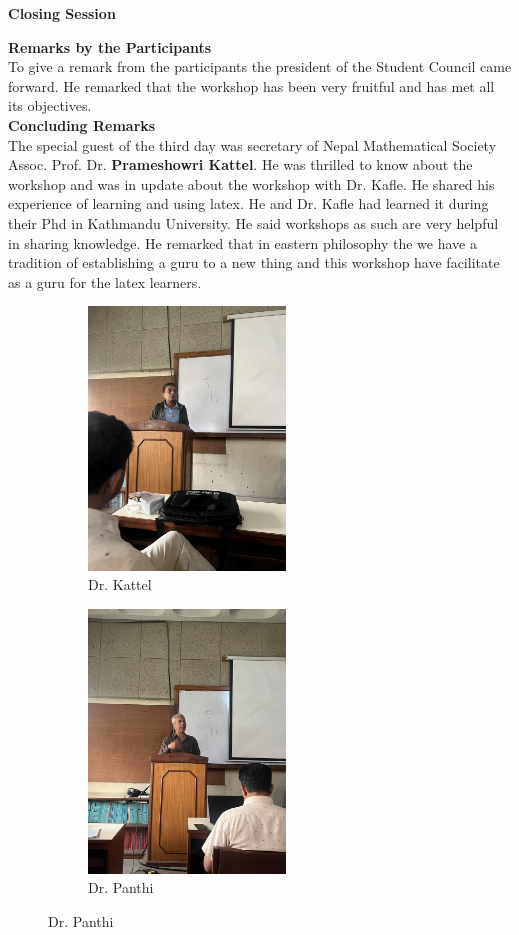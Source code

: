 \message{ !name(latexworkhop_report.tex)}\documentclass[a4paper,12pt]{report}
\begin{document}
\vspace*{3mm}
\begin{center}
  {\bfseries \Large Closing Session}
\end{center}
\vspace{5mm}

{\bfseries \large Remarks by the Participants}\\[3mm]
To give a remark from the participants the president of the Student Council came forward. He remarked that the workshop has been very fruitful and has met all its objectives.\\[7mm]

{\bfseries \large Concluding Remarks}\\[3mm]
The special guest of the third day was secretary of Nepal Mathematical Society Assoc. Prof. Dr. \textbf{Prameshowri Kattel}. He was thrilled to know about the workshop and was in update about the workshop with Dr. Kafle. He shared his experience of learning and using latex. He and Dr. Kafle had learned it during their Phd in Kathmandu University. He said workshops as such are very helpful in sharing knowledge. He remarked that in eastern philosophy the we have a tradition of establishing a guru to a new thing and this workshop have facilitate as a guru for the latex learners.
\vspace{5mm}

\begin{figure}[h!]
\centering
\begin{subfigure}{0.45\textwidth}
  \includegraphics[height=7cm, width=\textwidth]{pramesh.jpg}
  \caption{Dr. Kattel}
\end{subfigure}
\hfill
\begin{subfigure}{0.45\textwidth}
  \includegraphics[height=7cm, width=\textwidth]{dinesh.jpg}
  \caption{Dr. Panthi}
\end{subfigure}
\end{figure}
\end{document}
